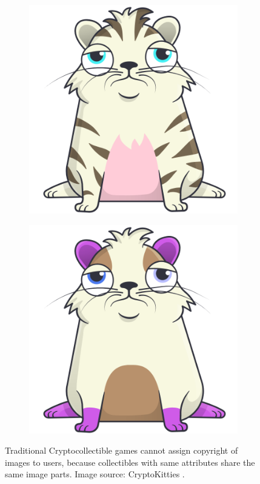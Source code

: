 \documentclass[b5paper]{article}
\begin{document}
\begin{figure}[!h]
\begin{subfigure}{0.5\textwidth}
  \includegraphics[width=\textwidth]{870796.png}
\end{subfigure}\hspace*{\fill}
\begin{subfigure}{0.5\textwidth}
  \includegraphics[width=\textwidth]{871240.png}
\end{subfigure}

\caption{
Traditional Cryptocollectible games cannot assign copyright of images to users, because collectibles with same attributes share the same image parts. Image source: CryptoKitties \cite{cryptokitties}.
}
\end{figure}
\end{document}
